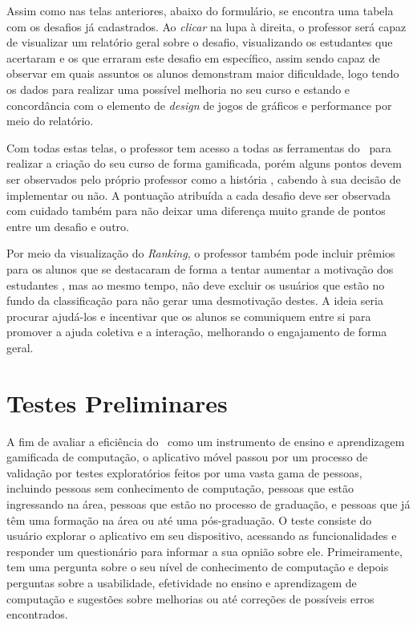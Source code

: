 
Assim como nas telas anteriores, abaixo do formulário, se encontra uma tabela com os desafios já cadastrados. Ao \textit{clicar} na lupa à direita, o professor será capaz de visualizar um relatório geral sobre o desafio, visualizando os estudantes que acertaram e os que erraram este desafio em específico, assim sendo capaz de observar em quais assuntos os alunos demonstram maior dificuldade, logo tendo os dados para realizar uma possível melhoria no seu curso e estando e concordância com o elemento de \textit{design} de jogos de gráficos e performance por meio do relatório.


Com todas estas telas, o professor tem acesso a todas as ferramentas do \appName\ para realizar a criação do seu curso de forma gamificada, porém alguns pontos devem ser observados pelo próprio professor como a história \cite{gamification_motivates}, cabendo à sua decisão de implementar ou não. A pontuação atribuída a cada desafio deve ser observada com cuidado também para não deixar uma diferença muito grande de pontos entre um desafio e outro. 

Por meio da visualização do \textit{Ranking}, o professor também pode incluir prêmios para os alunos que se destacaram de forma a tentar aumentar a motivação dos estudantes \cite{ranking_motivation}, mas ao mesmo tempo, não deve excluir os usuários que estão no fundo da classificação para não gerar uma desmotivação destes. A ideia seria procurar ajudá-los e incentivar que os alunos se comuniquem entre si para promover a ajuda coletiva e a interação, melhorando o engajamento de forma geral.

\section{Testes Preliminares}

A fim de avaliar a eficiência do \appName\ como um instrumento de ensino e aprendizagem gamificada de computação, o aplicativo móvel passou por um processo de validação por testes exploratórios feitos por uma vasta gama de pessoas, incluindo pessoas sem conhecimento de computação, pessoas que estão ingressando na área, pessoas que estão no processo de graduação, e pessoas que já têm uma formação na área ou até uma pós-graduação. O teste consiste do usuário explorar o aplicativo em seu dispositivo, acessando as funcionalidades e responder um questionário para informar a sua opnião sobre ele. Primeiramente, tem uma pergunta sobre o seu nível de conhecimento de computação e depois perguntas sobre a usabilidade, efetividade no ensino e aprendizagem de computação e sugestões sobre melhorias ou até correções de possíveis erros encontrados.

